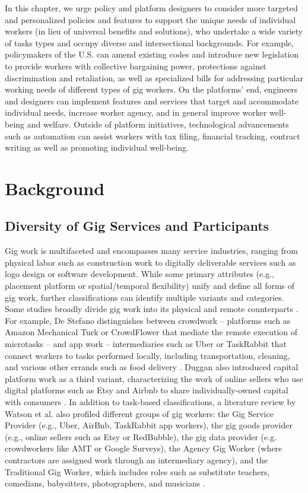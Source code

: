 In this chapter, we urge policy and platform designers to consider more targeted and personalized policies and features to support the unique needs of individual workers (in lieu of universal benefits and solutions), who undertake a wide variety of tasks types and occupy diverse and intersectional backgrounds. For example, policymakers of the U.S. can amend existing codes and introduce new legislation to provide workers with collective bargaining power, protections against discrimination and retaliation, as well as specialized bills for addressing particular working needs of different types of gig workers. On the platforms' end, engineers and designers can implement features and services that target and accommodate individual needs, increase worker agency, and in general improve worker well-being and welfare. Outside of platform initiatives, technological advancements such as automation can assist workers with tax filing, financial tracking, contract writing as well as promoting individual well-being.

\section{Background}
\subsection{Diversity of Gig Services and Participants}
Gig work is multifaceted and encompasses many service industries, ranging from physical labor such as construction work to digitally deliverable services such as logo design or software development. While some primary attributes (e.g., placement platform or spatial/temporal flexibility) unify and define all forms of gig work, further classifications can identify multiple variants and categories. Some studies broadly divide gig work into its physical and remote counterparts \cite{Fauzi2022-vd,personal}. For example, De Stefano distinguishes between crowdwork – platforms such as Amazon Mechanical Turk or CrowdFlower that mediate the remote execution of microtasks – and app work – intermediaries such as Uber or TaskRabbit that connect workers to tasks performed locally, including transportation, cleaning, and various other errands such as food delivery \cite{9Fa7}. Duggan also introduced capital platform work as a third variant, characterizing the work of online sellers who use digital platforms such as Etsy and Airbnb to share individually-owned capital with consumers \cite{Duggan2020-qh,Maffie2020-ap}. In addition to task-based classifications, a literature review by Watson et al. also profiled different groups of gig workers: the Gig Service Provider (e.g., Uber, AirBnb, TaskRabbit app workers), the gig goods provider (e.g., online sellers such as Etsy or RedBubble), the gig data provider (e.g. crowdworkers like AMT or Google Surveys), the Agency Gig Worker (where contractors are assigned work through an intermediary agency), and the Traditional Gig Worker, which includes roles such as substitute teachers, comedians, babysitters, photographers, and musicians \cite{looking}.


